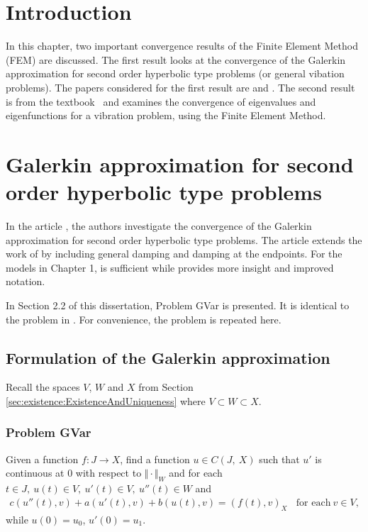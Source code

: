 \documentclass[../../main.tex]{subfiles}
\begin{document}
\section{Introduction}

In this chapter, two important convergence results of the Finite Element Method
(FEM) are discussed. The first result looks at the convergence of the Galerkin
approximation for second order hyperbolic type problems (or general vibation problems). The papers considered for the first result are \cite{BV13} and \cite{BSV17}. The second result is from the textbook~\cite{SF73} and examines the
convergence of eigenvalues and eigenfunctions for a vibration
problem, using the Finite Element Method.

\section{Galerkin approximation for second order hyperbolic type problems}\label{sec:convergence-of-the-galerkin-approximation}
In the article \cite{BV13}, the authors investigate the convergence of the
Galerkin approximation for second order hyperbolic type problems. The article
\cite{BSV17} extends the work of \cite{BV13} by including general damping and
damping at the endpoints. For the models in Chapter 1, \cite{BV13} is
sufficient while \cite{BSV17} provides more insight and improved notation.

In Section 2.2 of this dissertation, Problem GVar is presented. It is identical to the problem in
\cite{BV13}. For convenience, the problem is repeated here.

\subsection{Formulation of the Galerkin approximation}
Recall the spaces $V$, $W$ and $X$ from Section \ref{sec:existence:ExistenceAndUniqueness} where $V \subset W \subset X$.

\subsubsection*{Problem GVar}
Given a function $f:J\rightarrow X$, find a function $u\in C(J,\ X)$ such that $u'$ is continuous at $0$ with respect to
$\Vert \cdot \Vert_{W}$ and for each $t\in J,\ u(t)\in V,\ u'(t) \in V,\ u''(t)\in W$ and
\begin{eqnarray}
	c(u''(t),v)+a(u'(t),v)+b(u(t),v)= (f(t),v)_{X} \ \ \ \ \textrm{for each} \ v \in V, \label{GV_PB1}
\end{eqnarray}
while $u(0)=u_{0}$, $u'(0)=u_{1}$.
\end{document}
